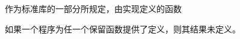 作为\cpp{}标准库的一部分所规定，由实现定义的函数

\begin{note}[\noindent]
  如果一个\cpp{}程序为任一个保留函数提供了定义，则其结果未定义。
\end{note}
